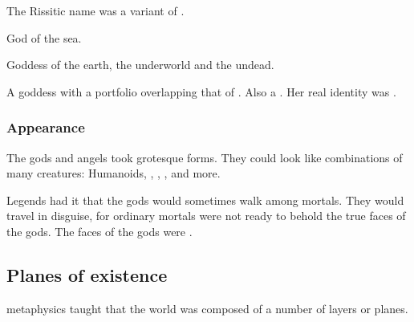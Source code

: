 \begin{gloss}
  The Rissitic name  was a variant of \quo{\Settras}. 



  \begin{comment}
  \subparagraph{Shellagh}
  \end{comment}
  God of the sea.  



  \begin{comment}
  \subparagraph{Sithra}
  \end{comment}



  \begin{comment}
  \subparagraph{\Thessulax}
  \end{comment}
  \gitemlink[Thessulax]{\Thessulax}
  \index{\Thessulax}
  Goddess of the earth, the underworld and the undead. 
  
  
  
  \begin{comment}
  \subparagraph{\Usherain}
  \end{comment}
  \gitemlink[Usherain]{\Usherain}
  \index{\Usherain}
  A goddess with a portfolio overlapping that of . 
  Also a .
  Her real identity was . 



\end{gloss}





\subsubsection{Appearance}
The \Ortaican gods and angels took grotesque forms.
They could look like combinations of many creatures:
Humanoids, \nycans, \lothae, \murocs,  and more. 

Legends had it that the gods would sometimes walk among mortals. 
They would travel in disguise, for ordinary mortals were not ready to behold the true faces of the gods. 
The faces of the gods were \arcana. 









\subsection{Planes of existence}
\Rethyax metaphysics taught that the world was composed of a number of layers or planes. 

